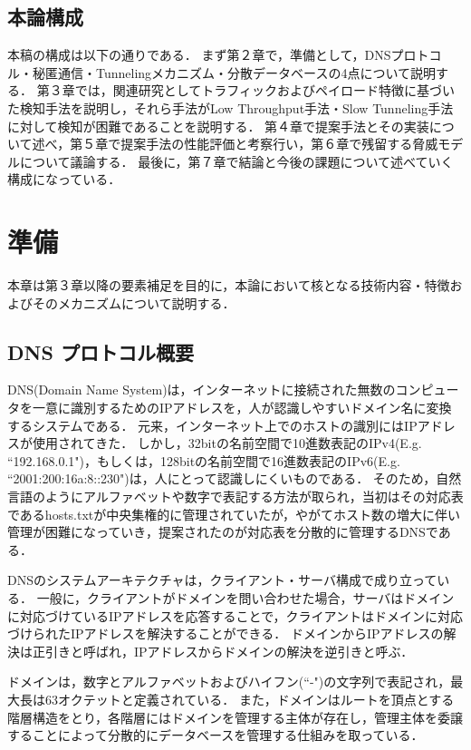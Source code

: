 \documentclass[12pt]{jarticle} %
\begin{document}
\subsection{本論構成}
本稿の構成は以下の通りである．
まず第２章で，準備として，DNSプロトコル・秘匿通信・Tunnelingメカニズム・分散データベースの4点について説明する．
第３章では，関連研究としてトラフィックおよびペイロード特徴に基づいた検知手法を説明し，それら手法がLow Throughput手法・Slow Tunneling手法に対して検知が困難であることを説明する．
第４章で提案手法とその実装について述べ，第５章で提案手法の性能評価と考察行い，第６章で残留する脅威モデルについて議論する．
最後に，第７章で結論と今後の課題について述べていく構成になっている．



\newpage
\section{準備}
本章は第３章以降の要素補足を目的に，本論において核となる技術内容・特徴およびそのメカニズムについて説明する．
\subsection{DNS プロトコル概要}
DNS(Domain Name System)は，インターネットに接続された無数のコンピュータを一意に識別するためのIPアドレスを，人が認識しやすいドメイン名に変換するシステムである．
元来，インターネット上でのホストの識別にはIPアドレスが使用されてきた．
しかし，32bitの名前空間で10進数表記のIPv4(E.g. ``192.168.0.1")，もしくは，128bitの名前空間で16進数表記のIPv6(E.g. ``2001:200:16a:8::230")は，人にとって認識しにくいものである．
そのため，自然言語のようにアルファベットや数字で表記する方法が取られ，当初はその対応表であるhosts.txtが中央集権的に管理されていたが，やがてホスト数の増大に伴い管理が困難になっていき，提案されたのが対応表を分散的に管理するDNSである．

DNSのシステムアーキテクチャは，クライアント・サーバ構成で成り立っている．
一般に，クライアントがドメインを問い合わせた場合，サーバはドメインに対応づけているIPアドレスを応答することで，クライアントはドメインに対応づけられたIPアドレスを解決することができる．
ドメインからIPアドレスの解決は正引きと呼ばれ，IPアドレスからドメインの解決を逆引きと呼ぶ．

ドメインは，数字とアルファベットおよびハイフン(``-")の文字列で表記され，最大長は63オクテットと定義されている．
また，ドメインはルートを頂点とする階層構造をとり，各階層にはドメインを管理する主体が存在し，管理主体を委譲することによって分散的にデータベースを管理する仕組みを取っている．
\end{document}
